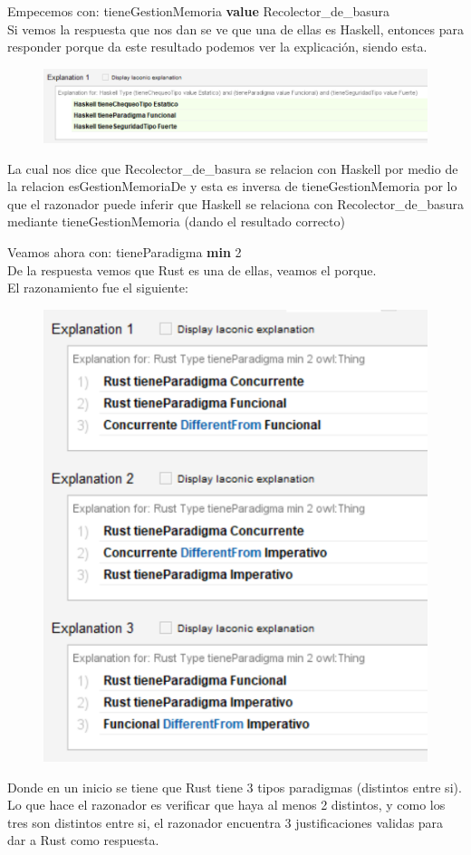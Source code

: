 \documentclass[12pt, titlepage, a4paper]{article}
\newcommand{\high}[2]{{\color{#1} \textbf{#2}}}
\begin{document}
Empecemos con: tieneGestionMemoria \high{magenta}{value} Recolector\_de\_basura\\
Si vemos la  respuesta que nos dan se ve que una de ellas es Haskell,
 entonces para responder porque da este resultado podemos ver la explicación, siendo esta. 
\begin{figure}[H]
    \centering
    \includegraphics[width=.8\textwidth]{Imagenes/Explicacion1.png}
    \caption{}
\end{figure}
La cual nos dice que Recolector\_de\_basura se relacion con Haskell por medio de 
la relacion esGestionMemoriaDe y esta es inversa de tieneGestionMemoria por lo 
que el razonador puede inferir que Haskell se relaciona con Recolector\_de\_basura 
mediante tieneGestionMemoria (dando el resultado correcto)

\noindent Veamos ahora con: tieneParadigma \high{magenta}{min} 2\\
De la respuesta vemos que Rust es una de ellas, veamos el porque.\\
El razonamiento fue el siguiente:
\begin{figure}[H]
    \centering
    \includegraphics[width=.5\textwidth]{Imagenes/Explicacion2.png}
    \caption{}
\end{figure}
Donde en un inicio se tiene que Rust tiene 3 tipos paradigmas (distintos entre si). 
Lo que hace el razonador es verificar que haya al menos 2 distintos, y como 
los tres son distintos entre si, el razonador encuentra 3 justificaciones 
validas para dar a Rust como respuesta.
\end{document}

